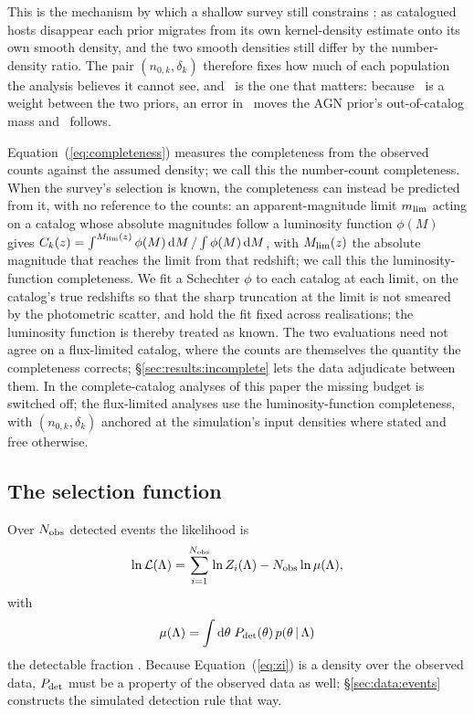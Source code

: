 This is the mechanism by which a shallow survey still constrains \fagn: as
catalogued hosts disappear each prior migrates from its own kernel-density
estimate onto its own smooth density, and the two smooth densities still differ
by the number-density ratio. The pair $(n_{0,k}, \delta_k)$ therefore fixes how
much of each population the analysis believes it cannot see, and \nzagn\ is the
one that matters: because \fagn\ is a weight between the two priors, an error
in \nzagn\ moves the AGN prior's out-of-catalog mass and \fagn\ follows.

Equation~(\ref{eq:completeness}) measures the completeness from the observed
counts against the assumed density; we call this the number-count
completeness. When the survey's selection is known, the completeness can
instead be predicted from it, with no reference to the counts: an
apparent-magnitude limit $m_{\rm lim}$ acting on a catalog whose absolute
magnitudes follow a luminosity function $\phi(M)$ gives
$C_k(z) = \int^{M_{\rm lim}(z)} \phi(M)\,\mathrm{d} M \,/ \int \phi(M)\,\mathrm{d} M$, with
$M_{\rm lim}(z)$ the absolute magnitude that reaches the limit from that
redshift; we call this the luminosity-function completeness. We fit a
Schechter $\phi$ \citep{Schechter1976} to each catalog at each limit, on the
catalog's true redshifts so that the sharp truncation at the limit is not
smeared by the photometric scatter, and hold the fit fixed across
realisations; the luminosity function is thereby treated as known. The two
evaluations need not agree on a flux-limited catalog, where the counts are
themselves the quantity the completeness corrects;
\S\ref{sec:results:incomplete} lets the data adjudicate between them. In the
complete-catalog analyses of this paper the missing budget is switched off;
the flux-limited analyses use the luminosity-function completeness, with
$(n_{0,k}, \delta_k)$ anchored at the simulation's input densities where
stated and free otherwise.

\subsection{The selection function}
\label{sec:methods:selection}

Over $N_{\rm obs}$ detected events the likelihood is
\begin{equation}
  \ln \mathcal{L}(\Lambda) = \sum_{i=1}^{N_{\rm obs}} \ln Z_i(\Lambda)
      - N_{\rm obs} \ln \mu(\Lambda),
  \label{eq:like}
\end{equation}
with
\begin{equation}
  \mu(\Lambda) = \int \mathrm{d}\theta\; P_{\rm det}(\theta)\, p(\theta \,|\, \Lambda)
  \label{eq:mu}
\end{equation}
the detectable fraction \citep{MandelFarrGair2019, Vitale2022}. Because
Equation~(\ref{eq:zi}) is a density over the observed data, $P_{\rm det}$ must
be a property of the observed data as well; \S\ref{sec:data:events} constructs
the simulated detection rule that way.

